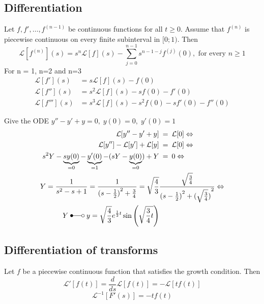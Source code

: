 \subsection{Differentiation}\label{ssec:laplaceDiff}
Let $f, f', \dots, f^{(n-1)}$ be continuous functions for all $t \geq 0$. Assume that $f^{(n)}$ is piecewise continuous on every finite subinterval in $[0;1)$. Then %
\begin{equation*}
    \mathcal{L}[f^{(n)}](s)=s^n\mathcal{L}[f](s)-\sum_{j=0}^{n-1}s^{n-1-j}f^{(j)}(0),\text{ for every }n\geq1
\end{equation*}
For n = 1, n=2 and n=3
\begin{align*}
    \mathcal{L}[f'](s)   & =s\mathcal{L}[f](s)-f(0)                    \\
    \mathcal{L}[f''](s)  & =s^2\mathcal{L}[f](s)-sf(0)-f'(0)           \\
    \mathcal{L}[f'''](s) & =s^3\mathcal{L}[f](s)-s^2f(0)-sf'(0)-f''(0) %
\end{align*}
\begin{examplesection}[Example]
    Give the ODE $y''-y'+y=0,\;y(0)=0,\;y'(0)=1$
    \begin{align*}
        \mathcal{L}[y''-y'+y]                                                               & \:=\:\mathcal{L}[0] \Leftrightarrow                                                     \\
        \mathcal{L}[y'']-\mathcal{L}[y']+\mathcal{L}[y]                                     & \:=\:\mathcal{L}[0] \Leftrightarrow                                                     \\
        s^2Y -\underbrace{sy(0)}_{=0}-\underbrace{y'(0)}_{=1}-(sY-\underbrace{y(0)}_{=0})+Y & \:=\:0 \Leftrightarrow                                                                  \\
        Y=\frac{1}{s^2-s+1}=\frac{1}{{(s-\frac{1}{2})}^2+\frac{3}{4}}=\sqrt{\frac{4}{3}}    & \frac{\sqrt{\frac{3}{4}}}{{(s-\frac{1}{2})}^2+{(\sqrt{\frac{3}{4}})}^2} \Leftrightarrow \\
        Y\;\Laplace\;y=\sqrt{\frac{4}{3}}e^{\frac{1}{2}t}\sin\left(\sqrt{\frac{3}{4}t}\right)
    \end{align*}
\end{examplesection}

\subsection{Differentiation of transforms}
Let $f$ be a piecewise continuous function that satisfies the growth condition. Then
\begin{equation*}
    \mathcal{L}'[f(t)] = \frac{d}{ds}\mathcal{L}[f(t)] = -\mathcal{L}[t f(t)]
\end{equation*}
\begin{equation*}
    \mathcal{L}^{-1}[F'(s)] = -tf(t)
\end{equation*}

